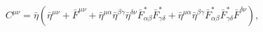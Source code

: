 \begin{equation}\label{cmn}
C^{\mu\nu} = \bar{\eta}\left(
\bar{\eta}^{\mu\nu} + \bar{F}^{\mu\nu} + \bar{\eta}^{\mu\alpha}
\bar{\eta}^{\beta\gamma}\bar{\eta}^{\delta\nu}
\bar{F}^*_{\alpha\beta}\bar{F}^*_{\gamma\delta}
+\bar{\eta}^{\mu\alpha}\bar{\eta}^{\beta\gamma}
\bar{F}^*_{\alpha\beta}\bar{F}^*_{\gamma\delta}\bar{F}^{\delta\nu}
\right),
\end{equation}


